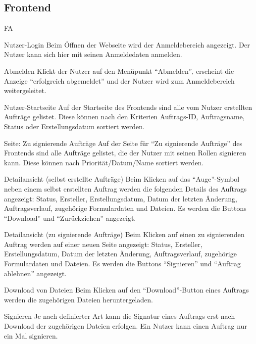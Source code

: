 \subsection{Frontend}
\begin{Kriterien}{FA}

	\item[Nutzer-Login] Beim Öffnen der Webseite wird der Anmeldebereich angezeigt. Der Nutzer kann sich hier mit seinen Anmeldedaten anmelden.

	\item[Abmelden] Klickt der Nutzer auf den Menüpunkt \enquote{Abmelden}, erscheint die Anzeige \enquote{erfolgreich abgemeldet} und der Nutzer wird zum Anmeldebereich weitergeleitet.

	\item[Nutzer-Startseite] Auf der Startseite des Frontends sind alle vom Nutzer erstellten Aufträge gelistet. Diese können nach den Kriterien Auftrags-ID, Auftragsname, \gls{Status} oder Erstellungsdatum sortiert werden.

	\item[Seite: Zu signierende Aufträge] Auf der Seite für \enquote{Zu signierende Aufträge} des Frontends sind alle Aufträge gelistet, die der Nutzer mit seinen Rollen signieren kann. Diese können nach Priorität/Datum/Name sortiert werden.

	\item[Detailansicht (selbst erstellte Aufträge)] Beim Klicken auf das
	\enquote{Auge}-Symbol neben einem selbst erstellten Auftrag werden die
	folgenden Details des Auftrags angezeigt: Status,
	Ersteller, Erstellungsdatum, Datum der letzten Änderung, Auftragsverlauf,
	zugehörige Formulardaten und Dateien.  Es werden die Buttons \enquote{Download} und
	\enquote{Zurückziehen} angezeigt.

	\item[Detailansicht (zu signierende Aufträge)] Beim Klicken auf einen
	zu signierenden Auftrag werden auf einer neuen Seite angezeigt:
	Status, Ersteller, Erstellungsdatum, Datum der letzten Änderung,
	Auftragsverlauf, zugehörige Formulardaten und Dateien. Es werden die Buttons
	\enquote{Signieren} und \enquote{Auftrag ablehnen} angezeigt.

	\item[Download von Dateien] Beim Klicken auf den \enquote{Download}-Button eines Auftrags werden die zugehörigen Dateien heruntergeladen.

	\item[Signieren] Je nach definierter Art kann die Signatur eines Auftrags erst nach Download der zugehörigen Dateien erfolgen. Ein Nutzer kann einen Auftrag nur ein Mal signieren.


\end{Kriterien}
